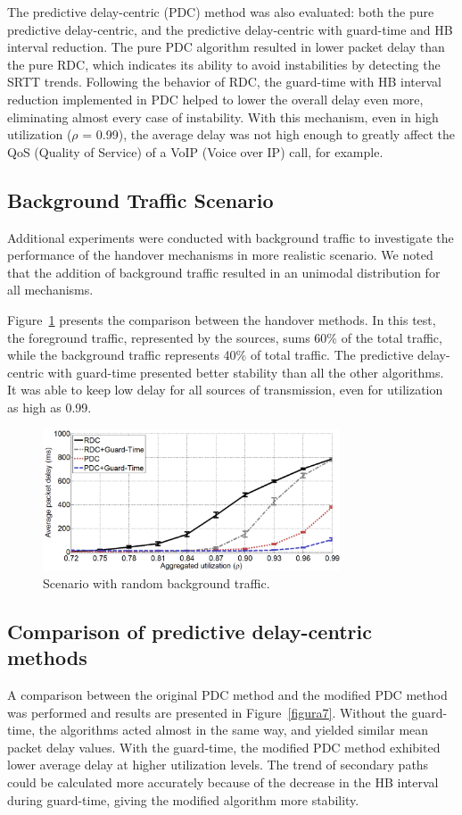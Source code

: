 \documentclass{sbrt2015}
\begin{document}
The predictive delay-centric (PDC) method was also evaluated: both the pure predictive delay-centric, and the predictive delay-centric with guard-time and HB interval reduction. The pure PDC algorithm resulted in lower packet delay than the pure RDC, which indicates its ability to avoid instabilities by detecting the SRTT trends.
Following the behavior of RDC, the guard-time with HB interval reduction implemented in PDC helped to lower the overall delay even more, eliminating almost every case of instability. With this mechanism, even in high utilization ($\rho$ = 0.99), the average delay was not high enough to greatly affect the QoS (Quality of Service) of a VoIP (Voice over IP) call, for example.

\subsection{Background Traffic Scenario}
Additional experiments were conducted with background traffic to investigate the performance of the handover mechanisms in more realistic scenario. 
We noted that the addition of background traffic resulted in an unimodal distribution for all mechanisms.

Figure~\ref{figura6} presents the comparison between the handover methods. In this test, the foreground traffic, represented by the sources, sums 60\% of the total traffic, while the background traffic represents 40\% of total traffic. The predictive delay-centric with guard-time presented better stability than all the other algorithms. It was able to keep low delay for all sources of transmission, even for utilization as high as 0.99.


\begin{figure}[h!]
\centering
\includegraphics[width=8.8cm,height=4.2cm]{figura6}
\caption{Scenario with random background traffic.}
\label{figura6}
\end{figure}

\subsection{Comparison of predictive delay-centric methods}
A comparison between the original PDC method and the modified PDC method was performed and results are presented in Figure~\ref{figura7}.
Without the guard-time, the algorithms acted almost in the same way, and yielded similar mean packet delay values. 
With the guard-time, the modified PDC method exhibited lower average delay at higher utilization levels. 
The trend of secondary paths could be calculated more accurately because of the decrease in the HB interval during guard-time, giving the modified algorithm more stability. 
\end{document}
